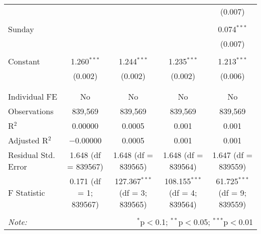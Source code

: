 \documentclass[
]{article}
\begin{document}
\begin{table}[!htbp]
{\begin{tabular}{@{\extracolsep{5pt}}lcccc}
  &  &  &  & (0.007) \\ 
  & & & & \\ 
 Sunday &  &  &  & 0.074$^{***}$ \\ 
  &  &  &  & (0.007) \\ 
  & & & & \\ 
 Constant & 1.260$^{***}$ & 1.244$^{***}$ & 1.235$^{***}$ & 1.213$^{***}$ \\ 
  & (0.002) & (0.002) & (0.002) & (0.006) \\ 
  & & & & \\ 
\hline \\[-1.8ex] 
Individual FE & No & No & No & No \\ 
Observations & 839,569 & 839,569 & 839,569 & 839,569 \\ 
R$^{2}$ & 0.00000 & 0.0005 & 0.001 & 0.001 \\ 
Adjusted R$^{2}$ & $-$0.00000 & 0.0005 & 0.001 & 0.001 \\ 
Residual Std. Error & 1.648 (df = 839567) & 1.648 (df = 839565) & 1.648 (df = 839564) & 1.647 (df = 839559) \\ 
F Statistic & 0.171 (df = 1; 839567) & 127.367$^{***}$ (df = 3; 839565) & 108.155$^{***}$ (df = 4; 839564) & 61.725$^{***}$ (df = 9; 839559) \\ 
\hline 
\hline \\[-1.8ex] 
\textit{Note:}  & \multicolumn{4}{r}{$^{*}$p$<$0.1; $^{**}$p$<$0.05; $^{***}$p$<$0.01} \\ 
\end{tabular}
} 
\end{table} 
\newpage
\end{document}

